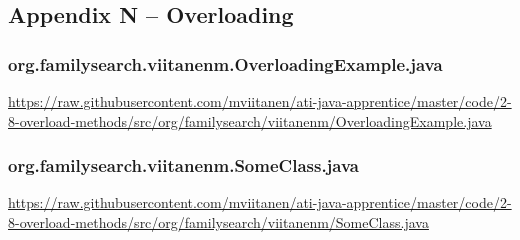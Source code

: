 \subsection*{Appendix N -- Overloading} \label{App:AppendixN}

\subsubsection*{org.familysearch.viitanenm.OverloadingExample.java}
\noindent
\begin{minipage}{.6in}
\end{minipage}
\begin{minipage}{6in}
  \url{https://raw.githubusercontent.com/mviitanen/ati-java-apprentice/master/code/2-8-overload-methods/src/org/familysearch/viitanenm/OverloadingExample.java}
\end{minipage}

\vspace{1em}
\subsubsection*{org.familysearch.viitanenm.SomeClass.java}
\noindent
\begin{minipage}{.6in}
\end{minipage}
\begin{minipage}{6in}
  \url{https://raw.githubusercontent.com/mviitanen/ati-java-apprentice/master/code/2-8-overload-methods/src/org/familysearch/viitanenm/SomeClass.java}
\end{minipage}
